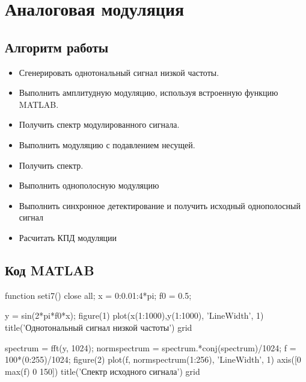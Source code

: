 \documentclass[10pt,a4paper]{report}
\begin{document}
\chapter{Аналоговая модуляция}
\section{Алгоритм работы}
\begin{itemize}
	\item Сгенерировать однотональный сигнал низкой частоты.
	\item Выполнить амплитудную модуляцию, используя встроенную функцию MATLAB.
	\item Получить спектр модулированного сигнала. 
	\item Выполнить модуляцию с подавлением несущей. 
	\item Получить спектр. 
	\item Выполнить однополосную модуляцию
	\item Выполнить синхронное детектирование и получить исходный однополосный сигнал
	\item Расчитать КПД модуляции
\end {itemize}
\section{Код MATLAB}
function seti7() \newline
close all;\newline
x = 0:0.01:4*pi;\newline
f0 = 0.5;\newline

y = sin(2*pi*f0*x);\newline
figure(1)\newline
plot(x(1:1000),y(1:1000), 'LineWidth', 1)\newline
title('Однотональный сигнал низкой частоты')\newline
grid\newline

spectrum = fft(y, 1024);\newline
normspectrum = spectrum.*conj(spectrum)/1024;\newline
f = 100*(0:255)/1024;\newline
figure(2)\newline
plot(f, normspectrum(1:256), 'LineWidth', 1)\newline
axis([0 max(f) 0 150])\newline
title('Спектр исходного сигнала')\newline
grid\newline
\end{document}

